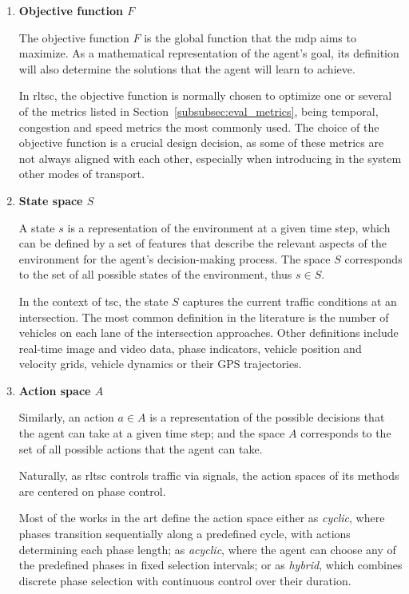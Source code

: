 \begin{enumerate}
    \item[] \textbf{Objective function $F$}
    
    \noindent The objective function $F$ is the global function that the \gls{mdp} aims to maximize. As a mathematical representation of the agent's goal, its definition will also determine the solutions that the agent will learn to achieve.

    In \gls{rltsc}, the objective function is normally chosen to optimize one or several of the metrics listed in Section~\ref{subsubsec:eval_metrics}, being temporal, congestion and speed metrics the most commonly used. The choice of the objective function is a crucial design decision, as some of these metrics are not always aligned with each other, especially when introducing in the system other modes of transport.
    
    \item[] \textbf{State space $S$}
    
    \noindent A state $s$ is a representation of the environment at a given time step, which can be defined by a set of features that describe the relevant aspects of the environment for the agent's decision-making process. The space $S$ corresponds to the set of all possible states of the environment, thus $s \in S$.

    In the context of \gls{tsc}, the state $S$ captures the current traffic conditions at an intersection. The most common definition in the literature is the number of vehicles on each lane of the intersection approaches. Other definitions include real-time image and video data, phase indicators, vehicle position and velocity grids, vehicle dynamics or their GPS trajectories.

    \item[] \textbf{Action space $A$} 
    
    \noindent Similarly, an action $a \in A$ is a representation of the possible decisions that the agent can take at a given time step; and the space $A$ corresponds to the set of all possible actions that the agent can take.
    
    Naturally, as \gls{rltsc} controls traffic via signals, the action spaces of its methods are centered on phase control.

    Most of the works in the art define the action space either as \textit{cyclic}, where phases transition sequentially along a predefined cycle, with actions determining each phase length; as \textit{acyclic}, where the agent can choose any of the predefined phases in fixed selection intervals; or as \textit{hybrid}, which combines discrete phase selection with continuous control over their duration.
  

\end{enumerate}
